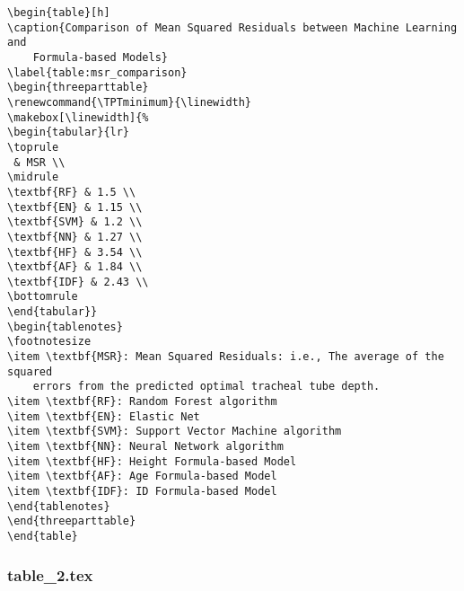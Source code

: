 \documentclass[11pt]{article}
\begin{document}
\begin{Verbatim}[tabsize=4]
\begin{table}[h]
\caption{Comparison of Mean Squared Residuals between Machine Learning and
	Formula-based Models}
\label{table:msr_comparison}
\begin{threeparttable}
\renewcommand{\TPTminimum}{\linewidth}
\makebox[\linewidth]{%
\begin{tabular}{lr}
\toprule
 & MSR \\
\midrule
\textbf{RF} & 1.5 \\
\textbf{EN} & 1.15 \\
\textbf{SVM} & 1.2 \\
\textbf{NN} & 1.27 \\
\textbf{HF} & 3.54 \\
\textbf{AF} & 1.84 \\
\textbf{IDF} & 2.43 \\
\bottomrule
\end{tabular}}
\begin{tablenotes}
\footnotesize
\item \textbf{MSR}: Mean Squared Residuals: i.e., The average of the squared
	errors from the predicted optimal tracheal tube depth.
\item \textbf{RF}: Random Forest algorithm
\item \textbf{EN}: Elastic Net
\item \textbf{SVM}: Support Vector Machine algorithm
\item \textbf{NN}: Neural Network algorithm
\item \textbf{HF}: Height Formula-based Model
\item \textbf{AF}: Age Formula-based Model
\item \textbf{IDF}: ID Formula-based Model
\end{tablenotes}
\end{threeparttable}
\end{table}

\end{Verbatim}

\subsubsection*{table\_2.tex}
\end{document}
